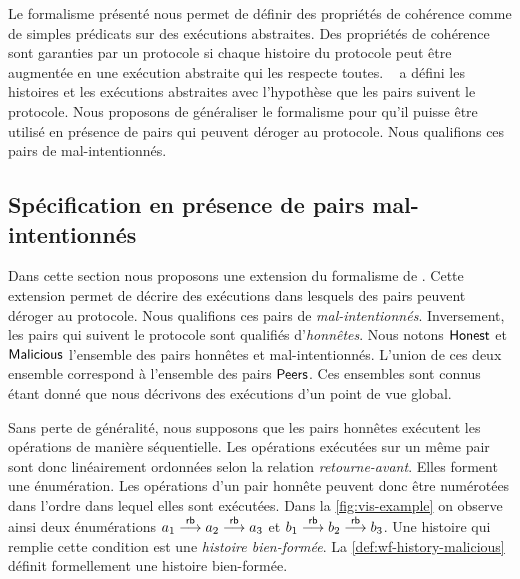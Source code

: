 Le formalisme présenté nous permet de définir des propriétés de cohérence comme de simples prédicats sur des exécutions abstraites.
Des propriétés de cohérence sont garanties par un protocole si chaque histoire du protocole peut être augmentée en une exécution abstraite qui les respecte toutes.
~\textcite{burckhardt_eventualconsistency_2014} a défini les histoires et les exécutions abstraites avec l'hypothèse que les pairs  suivent le protocole.
Nous proposons de généraliser le formalisme pour qu'il puisse être utilisé en présence de pairs qui peuvent déroger au protocole.
Nous qualifions ces pairs de mal-intentionnés.


\subsection{Spécification en présence de pairs mal-intentionnés}\label{subsec:consistency-spec-malicious}

%

Dans cette section nous proposons une extension du formalisme de \textcite{burckhardt_eventualconsistency_2014}.
Cette extension permet de décrire des exécutions dans lesquels des pairs peuvent déroger au protocole.
Nous qualifions ces pairs de \emph{mal-intentionnés}.
Inversement, les pairs qui suivent le protocole sont qualifiés d'\emph{honnêtes}.
Nous notons $\operatorname{\mathsf{Honest}}$ et $\operatorname{\mathsf{Malicious}}$ l'ensemble des pairs honnêtes et mal-intentionnés.
L'union de ces deux ensemble correspond à l'ensemble des pairs $\operatorname{\mathsf{Peers}}$.
Ces ensembles sont connus étant donné que nous décrivons des exécutions d'un point de vue global.

Sans perte de généralité, nous supposons que les pairs honnêtes exécutent les opérations de manière séquentielle.
Les opérations exécutées sur un même pair sont donc linéairement ordonnées selon la relation \emph{retourne-avant}.
Elles forment une énumération.
Les opérations d'un pair honnête peuvent donc être numérotées dans l'ordre dans lequel elles sont exécutées.
Dans la \autoref{fig:vis-example} on observe ainsi deux énumérations $a_1 \overset{\mathsf{rb}}{\longrightarrow} a_2 \overset{\mathsf{rb}}{\longrightarrow} a_3$ et $b_1 \overset{\mathsf{rb}}{\longrightarrow} b_2 \overset{\mathsf{rb}}{\longrightarrow} b_3$.
Une histoire qui remplie cette condition est une \emph{histoire bien-formée}.
La \autoref{def:wf-history-malicious} définit formellement une histoire bien-formée.

